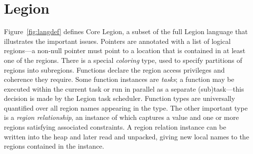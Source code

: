 \newcommand{\placeat}[3]{%
\makebox[0pt]{%
\hspace*{#1in} \raisebox{#2in}{#3}%
}%
}

\newcommand{\infrulez}[2]{\displaystyle\frac{\displaystyle\strut{#1}}{\displaystyle\strut {#2}}}
\newcommand{\cinfrulez}[3]{\parbox{14cm}{\hfil$\infrulez{#1}{#2}$\hfil}\parbox{4cm}{$\,#3$\hfil}}
\newcommand{\finfrulez}[2]{\framebox{$\infrulez{#1}{#2}$}}

\newcommand{\ruleat}[5]{
\node[below right] at (#1) {$\infrulez{#4}{#5}$};
\node[below] at (#2) {[#3]};
}

\newcommand{\ruleatx}[5]{
\node[below right,fill=white!50] at (#1) {$\infrulez{\begin{array}{l}#4\end{array}}{#5}$};
\node[below] at (#2) {[#3]};
}

\newcommand{\axiomat}[4]{
\node[below right] at (#1) {$#4$};
\node[below] at (#2) {[#3]};
}



\section{Legion}
\label{sec:legioncore}

Figure~\ref{fig:langdef} defines Core Legion, a subset of the full Legion language
that illustrates the important issues.  
Pointers are annotated with a list of logical regions---a non-null pointer must point to a 
location that is contained in at least one of the regions. There is a special
{\em coloring} type, used to specify partitions of regions into subregions.
Functions declare the region
access privileges and coherence they require.  Some function instances are {\em tasks}; a function may be executed
within the current task or run in parallel as a separate (sub)task---this decision is made
by the Legion task scheduler.  Function types are
universally quantified over all region names appearing in the type.
The other important type is a {\em region relationship}, an instance of which captures a value and
one or more regions satisfying associated constraints.  A region relation instance
can be written into the heap and later read and
unpacked, giving new local names to the regions contained in
the instance.

